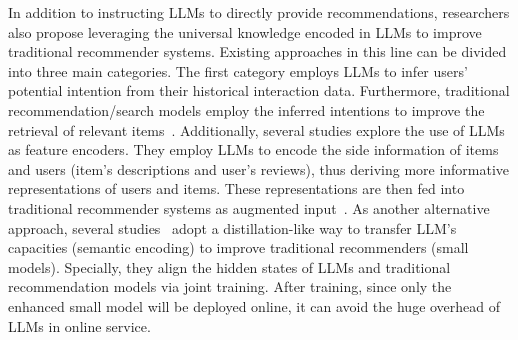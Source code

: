 {
In addition to instructing LLMs to directly provide recommendations, researchers also propose leveraging the universal knowledge encoded in LLMs to improve traditional recommender systems. 
Existing approaches in this line can be divided into three main categories. The first category employs LLMs to infer users' potential intention from their historical interaction data. Furthermore, traditional recommendation/search models employ the inferred intentions to improve the retrieval of  relevant items~\cite{xi-arxiv-2023-towards, liu-arxiv-2023-a}. Additionally, several studies explore the use of LLMs as feature encoders. %
They employ LLMs to encode the side information of items and users (\eg item's descriptions and user's reviews), %
thus deriving more informative representations of users and items. These representations are then fed into traditional recommender systems as augmented  input~\cite{li-arxiv-2023-exploring, Wei-arixiv-2023-llmrec}. %
{
As another alternative approach, 
several studies~\cite{Li-arxiv-2023-ctrl, Muhamed-nips-2021-ctr-bert} adopt a distillation-like way to transfer LLM's    capacities (\eg semantic encoding) to improve traditional recommenders (\ie small models). 
Specially, they align the hidden states of LLMs and traditional recommendation models via joint training. After training, since only the enhanced small model will be deployed online,  it can avoid  the huge overhead of LLMs in online service.    
}



















}
